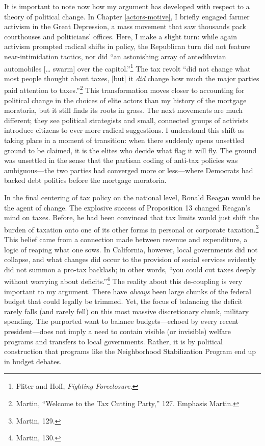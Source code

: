 \documentclass[
]{article}
\begin{document}
It is important to note now how my argument has developed with respect to a theory of political change.
In Chapter \ref{actors-motive}, I briefly engaged farmer activism in the Great Depression, a mass movement that saw thousands pack courthouses and politicians' offices.
Here, I make a slight turn: while again activism prompted radical shifts in policy, the Republican turn did not feature near-intimidation tactics, nor did ``an astonishing array of antediluvian automobiles {[}\ldots{} swarm{]} over the capitol.''\footnote{Fliter and Hoff, \emph{Fighting Foreclosure}.}
The tax revolt ``did not change what most people thought about taxes, {[}but{]} it \emph{did} change how much the major parties paid attention to taxes.''\footnote{Martin, ``Welcome to the Tax Cutting Party,'' 127. Emphasis Martin.}
This transformation moves closer to accounting for political change in the choices of elite actors than my history of the mortgage moratoria, but it still finds its roots in grass.
The next movements are much different; they see political strategists and small, connected groups of activists introduce citizens to ever more radical suggestions.
I understand this shift as taking place in a moment of transition: when there suddenly opens unsettled ground to be claimed, it is the elites who decide what flag it will fly.
The ground was unsettled in the sense that the partisan coding of anti-tax policies was ambiguous---the two parties had converged more or less---where Democrats had backed debt politics before the mortgage moratoria.

In the final centering of tax policy on the national level, Ronald Reagan would be the agent of change.
The explosive success of Proposition 13 changed Reagan's mind on taxes.
Before, he had been convinced that tax limits would just shift the burden of taxation onto one of its other forms in personal or corporate taxation.\footnote{Martin, 129.}
This belief came from a connection made between revenue and expenditure, a logic of reaping what one sows.
In California, however, local governments did not collapse, and what changes did occur to the provision of social services evidently did not summon a pro-tax backlash; in other words, ``you could cut taxes deeply without worrying about deficits.''\footnote{Martin, 130.}
The reality about this de-coupling is very important to my argument.
There have \emph{always} been large chunks of the federal budget that could legally be trimmed.
Yet, the focus of balancing the deficit rarely falls (and rarely fell) on this most massive discretionary chunk, military spending.
The purported want to balance budgets---echoed by every recent president---does not imply a need to contain visible (or invisible) welfare programs and transfers to local governments.
Rather, it is by political construction that programs like the Neighborhood Stabilization Program end up in budget debates.
\end{document}
